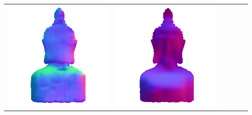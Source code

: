 \begin{tabularx}{\linewidth}{@{}Y@{}Y@{}Y@{}Y@{}Y@{}Y@{}}
\includegraphics[width=\linewidth]{semisynthetic/20160617_16_marrnet_out.png} &
\includegraphics[width=\linewidth]{semisynthetic/20160617_16_ef_out.png} \\

\end{tabularx}
